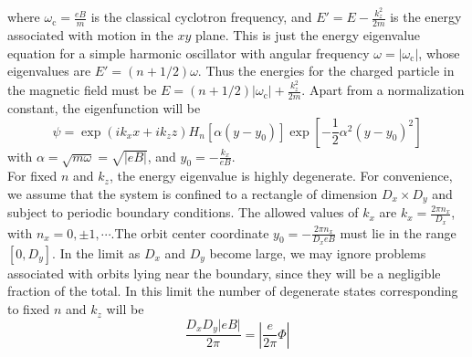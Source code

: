 where $\omega_{\mathrm{c}} = \frac{eB}{m}$ is the classical cyclotron frequency, and $E'=E-\frac{k_z^2}{2m}$ is the energy associated with motion in the $xy$ plane. This is just the energy eigenvalue equation for a simple harmonic oscillator with angular frequency $\omega = |\omega_{\mathrm{c}}|$, whose eigenvalues are $E' = (n+1/2)\omega$. Thus the energies for the charged particle in the magnetic field must be $E = (n+1/2)|\omega_{\mathrm{c}}|+\frac{k_z^2}{2m}$. Apart from a normalization constant, the eigenfunction will be
\[\psi = \exp(ik_xx+ik_zz) H_n[\alpha(y-y_0)]\exp[-\frac{1}{2}\alpha^2 (y-y_0)^2]\]
with $\alpha = \sqrt{m\omega} = \sqrt{|eB|}$, and $y_0 = - \frac{k_x}{eB}$.\\
For fixed $n$ and $k_z$, the energy eigenvalue is highly degenerate. For convenience, we assume that the system is confined to a rectangle of dimension $D_x\times D_y$ and subject to periodic boundary conditions. The allowed
values of $k_x$ are $k_x = \frac{2\pi n_x}{D_x}$, with $n_x = 0,\pm1,\cdots$.The orbit center coordinate $y_0 = -\frac{2\pi n_x}{D_xeB}$ must lie in the range $[0,D_y]$. In the limit as $D_x$ and $D_y$ become large, we may ignore problems associated with orbits lying near the boundary, since they will be a negligible fraction of the total. In this limit the number of degenerate states corresponding to fixed $n$ and $k_z$ will be
\[\frac{D_xD_y |eB|}{2\pi} = \left| \frac{e}{2\pi} \Phi \right|\]

